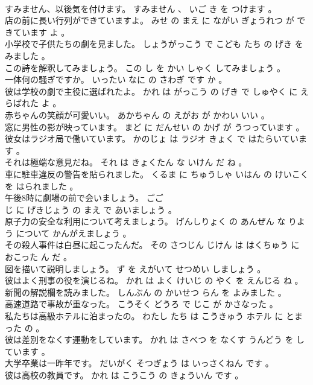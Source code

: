 \documentclass[8pt]{extreport}
\begin{document}
\begin{CJK}{UTF8}{min}
\\	すみません、以後気を付けます。	すみません 、 いご き を つけます 。 
\\	店の前に長い行列ができていますよ。	みせ の まえ に ながい ぎょうれつ が できています よ 。 
\\	小学校で子供たちの劇を見ました。	しょうがっこう で こども たち の げき を みました 。 
\\	この詩を解釈してみましょう。	この し を かい しゃく してみましょう 。 
\\	一体何の騒ぎですか。	いったい なに の さわぎ です か 。 
\\	彼は学校の劇で主役に選ばれたよ。	かれ は がっこう の げき で しゅやく に えらばれた よ 。 
\\	赤ちゃんの笑顔が可愛いい。	あかちゃん の えがお が かわい いい 。 
\\	窓に男性の影が映っています。	まど に だんせい の かげ が うつっています 。 
\\	彼女はラジオ局で働いています。	かのじょ は ラジオ きょく で はたらいています 。 
\\	それは極端な意見だね。	それ は きょくたん な いけん だ ね 。 
\\	車に駐車違反の警告を貼られました。	くるま に ちゅうしゃ いはん の けいこく を はられました 。 
\\	午後8時に劇場の前で会いましょう。	ごご 
\\	じ に げきじょう の まえ で あいましょう 。 
\\	原子力の安全な利用について考えましょう。	げんしりょく の あんぜん な りよう について かんがえましょう 。 
\\	その殺人事件は白昼に起こったんだ。	その さつじん じけん は はくちゅう に おこった ん だ 。 
\\	図を描いて説明しましょう。	ず を えがいて せつめい しましょう 。 
\\	彼はよく刑事の役を演じるね。	かれ は よく けいじ の やく を えんじる ね 。 
\\	新聞の解説欄を読みました。	しんぶん の かいせつ らん を よみました 。 
\\	高速道路で事故が重なった。	こうそく どうろ で じこ が かさなった 。 
\\	私たちは高級ホテルに泊まったの。	わたし たち は こうきゅう ホテル に とまった の 。 
\\	彼は差別をなくす運動をしています。	かれ は さべつ を なくす うんどう を しています 。 
\\	大学卒業は一昨年です。	だいがく そつぎょう は いっさくねん です 。 
\\	彼は高校の教員です。	かれ は こうこう の きょういん です 。 

\end{CJK}
\end{document}
